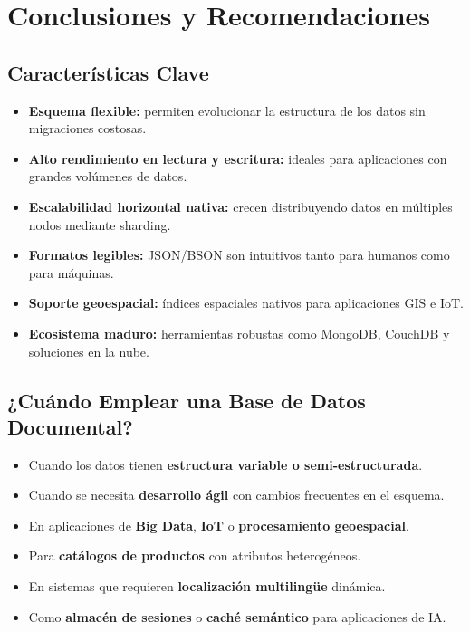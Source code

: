 \documentclass[conference]{IEEEtran}
\begin{document}
\section{Conclusiones y Recomendaciones}

\subsection{Características Clave}
\begin{itemize}
    \item \textbf{Esquema flexible:} permiten evolucionar la estructura de los datos sin migraciones costosas.
    \item \textbf{Alto rendimiento en lectura y escritura:} ideales para aplicaciones con grandes volúmenes de datos.
    \item \textbf{Escalabilidad horizontal nativa:} crecen distribuyendo datos en múltiples nodos mediante sharding.
    \item \textbf{Formatos legibles:} JSON/BSON son intuitivos tanto para humanos como para máquinas.
    \item \textbf{Soporte geoespacial:} índices espaciales nativos para aplicaciones GIS e IoT.
    \item \textbf{Ecosistema maduro:} herramientas robustas como MongoDB, CouchDB y soluciones en la nube.
\end{itemize}

\subsection{¿Cuándo Emplear una Base de Datos Documental?}
\begin{itemize}
    \item Cuando los datos tienen \textbf{estructura variable o semi-estructurada}.
    \item Cuando se necesita \textbf{desarrollo ágil} con cambios frecuentes en el esquema.
    \item En aplicaciones de \textbf{Big Data}, \textbf{IoT} o \textbf{procesamiento geoespacial}.
    \item Para \textbf{catálogos de productos} con atributos heterogéneos.
    \item En sistemas que requieren \textbf{localización multilingüe} dinámica.
    \item Como \textbf{almacén de sesiones} o \textbf{caché semántico} para aplicaciones de IA.
\end{itemize}
\end{document}
